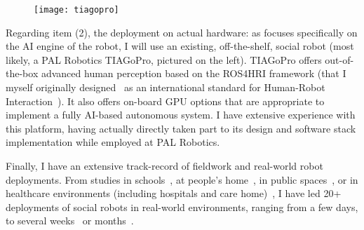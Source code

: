 \begin{figure}
    \centering
    \vspace{-10pt}
    \texttt{[image: tiagopro]}
    \label{fig|tiagopro}
\end{figure}

Regarding item (2), the deployment on actual hardware: as \project focuses
specifically on the AI engine of the robot, I will use an existing,
off-the-shelf, social robot (most likely, a PAL Robotics TIAGoPro, pictured on
the left). TIAGoPro offers out-of-the-box advanced human perception based on the
ROS4HRI framework (that I myself originally
designed~\autocite{mohamed2021ros4hri} as an international standard for
Human-Robot Interaction~\autocite{lemaignan2022ros}). It also offers on-board
GPU options that are appropriate to implement a fully AI-based autonomous
system.  I have extensive experience with this platform, having actually
directly taken part to its design and software stack implementation while
employed at PAL Robotics.

Finally, I have an extensive track-record of fieldwork and real-world robot
deployments. From studies in schools~\autocite{hood2015when,
lemaignan2016learning, jacq2016building,
baxter2015wider,kennedy2016cautious,senft2018robots,lemaignan2022social}, at
people's home~\autocite{mondada2015ranger}, in public
spaces~\autocite{alhafnawi2022deliberative}, or in healthcare environments
(including hospitals and care
home)~\autocite{winkle2020couch,cooper2023challenges}, I have led 20+
deployments of social robots in real-world environments, ranging from a few
days, to several weeks~\autocite{jacq2016building,lemaignan2022social} or
months~\autocite{winkle2020couch}.





\newpage

\printbibliography



